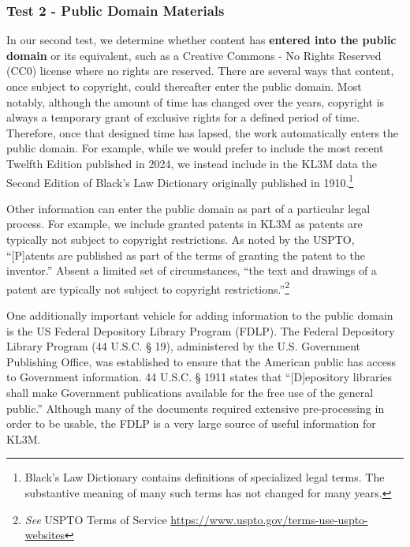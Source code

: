 \subsubsection{Test 2 - Public Domain Materials}
In our second test, we determine whether content has \textbf{entered into the public domain} or its equivalent, such as a Creative Commons - No Rights Reserved (CC0) license where no rights are reserved. There are several ways that content, once subject to copyright, could thereafter enter the public domain.  Most notably, although the amount of time has changed over the years, copyright is always a temporary grant of exclusive rights for a defined period of time.  Therefore, once that designed time has lapsed, the work automatically enters the public domain.  For example, while we would prefer to include the most recent Twelfth Edition\cite{black2024} published in 2024, we instead include in the KL3M data the Second Edition of Black's Law Dictionary originally published in 1910.\footnote{Black's Law Dictionary contains definitions of specialized legal terms. The substantive meaning of many such terms has not changed for many years.} 

Other information can enter the public domain as part of a particular legal process.  For example, we include granted patents in KL3M as patents are typically not subject to copyright restrictions.  As noted by the USPTO, ``[P]atents are published as part of the terms of granting the patent to the inventor.''  Absent a limited set of circumstances, ``the text and drawings of a patent are typically not subject to copyright restrictions.''\footnote{\textit{See} USPTO Terms of Service \url{https://www.uspto.gov/terms-use-uspto-websites}}  

One additionally important vehicle for adding information to the public domain is the US Federal Depository Library Program (FDLP). The Federal Depository Library Program (44 U.S.C. § 19), administered by the U.S. Government Publishing Office, was established to ensure that the American public has access to Government information. 44 U.S.C. § 1911 states that ``[D]epository libraries shall make Government publications available for the free use of the general public.''  Although many of the documents required extensive pre-processing in order to be usable, the FDLP is a very large source of useful information for KL3M.  


